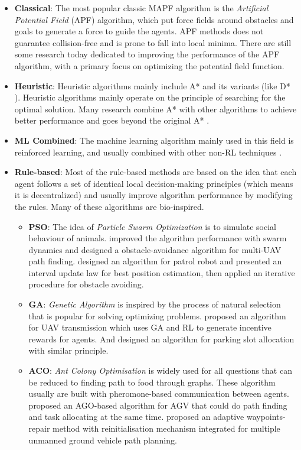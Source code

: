 \documentclass[12pt, oneside]{article}
\begin{document}
\begin{itemize}
    \item \textbf{Classical}: The most popular classic MAPF algorithm is the \textit{Artificial Potential Field} (APF) algorithm, which put force fields around obstacles and goals to generate a force to guide the agents. APF methods does not guarantee collision-free and is prone to fall into local minima. There are still some research today dedicated to improving the performance of the APF algorithm, with a primary focus on optimizing the potential field function\cite{APF_improv2,APF_improv3,APF_improv4}.
    \item \textbf{Heuristic}: Heuristic algorithms mainly include A* and its variants (like  D* \cite{D*}). Heuristic algorithms mainly operate on the principle of searching for the optimal solution. Many research combine A* with other algorithms to achieve better performance and goes beyond the original A* \cite{A*_1,A*_2}.
    \item \textbf{ML Combined}: The machine learning algorithm mainly used in this field is reinforced learning, and usually combined with other non-RL techniques \cite{RL_1,RL_2,RL_3,RL_4}. 
    \item \textbf{Rule-based}: Most of the rule-based methods are based on the idea that each agent follows a set of identical local decision-making principles (which means it is decentralized) and usually improve algorithm performance by modifying the rules. Many of these algorithms are bio-inspired.
     \begin{itemize}
         \item \textbf{PSO}: The idea of \textit{Particle Swarm Optimization} is to simulate social behaviour of animals. \cite{PSO_1} improved the algorithm performance with swarm dynamics and designed a obstacle-avoidance algorithm for multi-UAV path finding. \cite{PSO_2} designed an algorithm for patrol robot and presented an interval update law for best position estimation, then applied an iterative procedure for obstacle avoiding.
         \item \textbf{GA}: \textit{Genetic Algorithm} is inspired by the process of natural selection that is popular for solving optimizing problems. \cite{GA_1} proposed an algorithm for UAV transmission which uses GA and RL to generate incentive rewards for agents. And \cite{GA_2} designed an algorithm for parking slot allocation with similar principle.
         \item \textbf{ACO}: \textit{Ant Colony Optimisation} is widely used for all questions that can be reduced to finding path to food through graphs. These algorithm usually are built with pheromone-based communication between agents. \cite{AGO_1} proposed an AGO-based algorithm for AGV that could do path finding and task allocating at the same time.  \cite{AGO_2} proposed an adaptive waypoints-repair method with reinitialisation mechanism integrated for multiple unmanned ground vehicle path planning.

\end{itemize}
\end{itemize}
\end{document}
